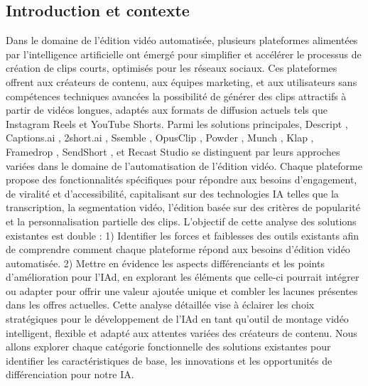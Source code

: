 \documentclass[livre]{udes-genie-these}
\begin{document}
\subsection{Introduction et contexte}
Dans le domaine de l'édition vidéo automatisée, plusieurs plateformes alimentées par l'intelligence artificielle ont émergé pour simplifier et accélérer le processus de création de clips courts, optimisés pour les réseaux sociaux. Ces plateformes offrent aux créateurs de contenu, aux équipes marketing, et aux utilisateurs sans compétences techniques avancées la possibilité de générer des clips attractifs à partir de vidéos longues, adaptés aux formats de diffusion actuels tels que Instagram Reels et YouTube Shorts.
Parmi les solutions principales, Descript \cite{descript2024}, Captions.ai \cite{captions2024}, 2short.ai \cite{short2024}, Ssemble \cite{ssemble2024}, OpusClip \cite{opusclip2024}, Powder \cite{powder2024}, Munch \cite{munch2024}, Klap \cite{klap2024}, Framedrop \cite{framedrop2024}, SendShort \cite{sendshort2024}, et Recast Studio \cite{recast2024} se distinguent par leurs approches variées dans le domaine de l'automatisation de l'édition vidéo. Chaque plateforme propose des fonctionnalités spécifiques pour répondre aux besoins d'engagement, de viralité et d'accessibilité, capitalisant sur des technologies IA telles que la transcription, la segmentation vidéo, l'édition basée sur des critères de popularité et la personnalisation partielle des clips.
L'objectif de cette analyse des solutions existantes est double :
1) Identifier les forces et faiblesses des outils existants afin de comprendre comment chaque plateforme répond aux besoins d'édition vidéo automatisée.
2) Mettre en évidence les aspects différenciants et les points d'amélioration pour l'IAd, en explorant les éléments que celle-ci pourrait intégrer ou adapter pour offrir une valeur ajoutée unique et combler les lacunes présentes dans les offres actuelles.
Cette analyse détaillée vise à éclairer les choix stratégiques pour le développement de l'IAd en tant qu'outil de montage vidéo intelligent, flexible et adapté aux attentes variées des créateurs de contenu. Nous allons explorer chaque catégorie fonctionnelle des solutions existantes pour identifier les caractéristiques de base, les innovations et les opportunités de différenciation pour notre IA.
\end{document}
